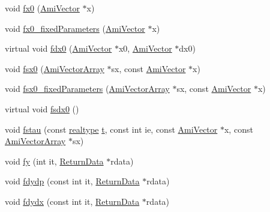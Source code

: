 \begin{DoxyCompactItemize}
\item 
void \mbox{\hyperlink{classamici_1_1_model_aa9a9e12a414d9ac91249b63d01ab7bca}{fx0}} (\mbox{\hyperlink{classamici_1_1_ami_vector}{Ami\+Vector}} $\ast$x)
\item 
void \mbox{\hyperlink{classamici_1_1_model_ae517574d2a7c504c388438a08a1aed38}{fx0\+\_\+fixed\+Parameters}} (\mbox{\hyperlink{classamici_1_1_ami_vector}{Ami\+Vector}} $\ast$x)
\item 
virtual void \mbox{\hyperlink{classamici_1_1_model_a8c3a1647a75581d9e2fc5de106d87a0d}{fdx0}} (\mbox{\hyperlink{classamici_1_1_ami_vector}{Ami\+Vector}} $\ast$x0, \mbox{\hyperlink{classamici_1_1_ami_vector}{Ami\+Vector}} $\ast$dx0)
\item 
void \mbox{\hyperlink{classamici_1_1_model_a6f46a63f0524ad25e4125254b78fdee9}{fsx0}} (\mbox{\hyperlink{classamici_1_1_ami_vector_array}{Ami\+Vector\+Array}} $\ast$sx, const \mbox{\hyperlink{classamici_1_1_ami_vector}{Ami\+Vector}} $\ast$x)
\item 
void \mbox{\hyperlink{classamici_1_1_model_acd951497e01220e545bbb238cc48e7bb}{fsx0\+\_\+fixed\+Parameters}} (\mbox{\hyperlink{classamici_1_1_ami_vector_array}{Ami\+Vector\+Array}} $\ast$sx, const \mbox{\hyperlink{classamici_1_1_ami_vector}{Ami\+Vector}} $\ast$x)
\item 
virtual void \mbox{\hyperlink{classamici_1_1_model_a946b60982bd7321bcc2bdae10ea8358f}{fsdx0}} ()
\item 
void \mbox{\hyperlink{classamici_1_1_model_a382cd2049c70f0dd4aafe483e4a50cff}{fstau}} (const \mbox{\hyperlink{namespaceamici_a1bdce28051d6a53868f7ccbf5f2c14a3}{realtype}} \mbox{\hyperlink{classamici_1_1_model_a711281d57e9710226face29151cc4641}{t}}, const int ie, const \mbox{\hyperlink{classamici_1_1_ami_vector}{Ami\+Vector}} $\ast$x, const \mbox{\hyperlink{classamici_1_1_ami_vector_array}{Ami\+Vector\+Array}} $\ast$sx)
\item 
void \mbox{\hyperlink{classamici_1_1_model_acd37693bbc14eead48d9a40c72f42a89}{fy}} (int it, \mbox{\hyperlink{classamici_1_1_return_data}{Return\+Data}} $\ast$rdata)
\item 
void \mbox{\hyperlink{classamici_1_1_model_a884ccb083130cb1af7ebe93f7a6d361a}{fdydp}} (const int it, \mbox{\hyperlink{classamici_1_1_return_data}{Return\+Data}} $\ast$rdata)
\item 
void \mbox{\hyperlink{classamici_1_1_model_a3ec46e89aed7bd191fb21ac3e501edd2}{fdydx}} (const int it, \mbox{\hyperlink{classamici_1_1_return_data}{Return\+Data}} $\ast$rdata)
\item 

\end{DoxyCompactItemize}
